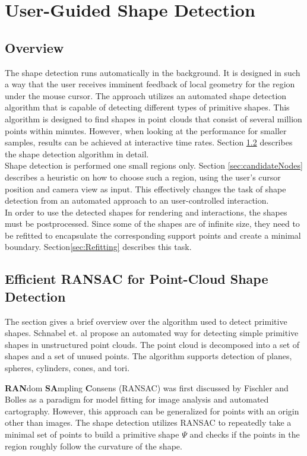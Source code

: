\chapter{User-Guided Shape Detection}
\newpage
\section{Overview}
The shape detection runs automatically in the background. It is designed in such a way that the user receives imminent feedback of local geometry for the region under the mouse cursor. The approach utilizes an automated shape detection algorithm that is capable of detecting different types of primitive shapes. This algorithm is designed to find shapes in point clouds that consist of several million points within minutes. However, when looking at the performance for smaller samples, results can be achieved at interactive time rates. Section \ref{sec:schnabel} describes the shape detection algorithm in detail. 
\\
Shape detection is performed one small regions only. Section \ref{sec:candidateNodes} describes a heuristic on how to choose such a region, using the user's cursor position and camera view as input. This effectively changes the task of shape detection from an automated approach to an user-controlled interaction.
\\ 
In order to use the detected shapes for rendering and interactions, the shapes must be postprocessed. Since some of the shapes are of infinite size, they need to be refitted to  encapsulate the corresponding support points and create a minimal boundary. Section\ref{sec:Refitting} describes this task. 

\section{Efficient RANSAC for Point-Cloud Shape Detection}
\label{sec:schnabel}
The section gives a brief overview over the algorithm used to detect primitive shapes. 
Schnabel et. al\cite{schnabel-2007-efficient} propose an automated way for detecting simple primitive shapes in unstructured point clouds. The point cloud is decomposed into a set of shapes and a set of unused points. The algorithm supports detection of planes, spheres, cylinders, cones, and tori. 

\textbf{RAN}dom \textbf{SA}mpling \textbf{C}onsens (RANSAC) was first discussed by Fischler and Bolles\cite{fischler1981random} as a paradigm for model fitting for image analysis and automated cartography. However, this approach can be generalized for points with an origin other than images. The shape detection utilizes RANSAC to repeatedly take a minimal set of points to build a primitive shape $\Psi$ and checks if the points in the region roughly follow the curvature of the shape. 

